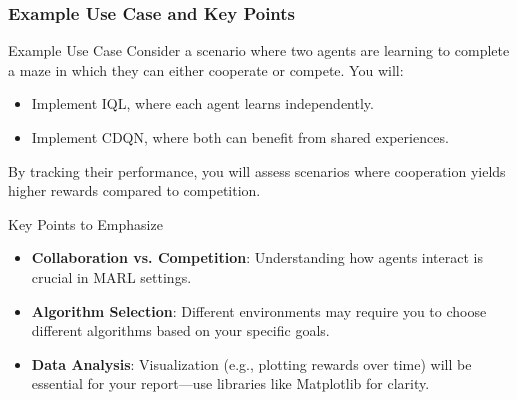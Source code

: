 \documentclass[aspectratio=169]{beamer}
\begin{document}
\begin{frame}[fragile]
    \frametitle{Example Use Case and Key Points}
    \begin{block}{Example Use Case}
        Consider a scenario where two agents are learning to complete a maze in which they can either cooperate or compete. You will:
        \begin{itemize}
            \item Implement IQL, where each agent learns independently.
            \item Implement CDQN, where both can benefit from shared experiences.
        \end{itemize}
        By tracking their performance, you will assess scenarios where cooperation yields higher rewards compared to competition.
    \end{block}

    \begin{block}{Key Points to Emphasize}
        \begin{itemize}
            \item \textbf{Collaboration vs. Competition}: Understanding how agents interact is crucial in MARL settings.
            \item \textbf{Algorithm Selection}: Different environments may require you to choose different algorithms based on your specific goals.
            \item \textbf{Data Analysis}: Visualization (e.g., plotting rewards over time) will be essential for your report—use libraries like Matplotlib for clarity.
        \end{itemize}
    \end{block}
\end{frame}
\end{document}
